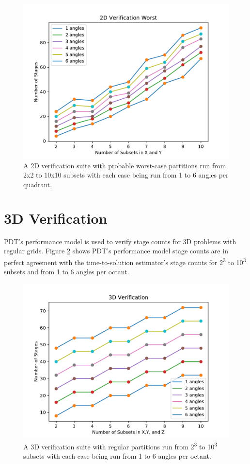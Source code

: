 \begin{figure}[H]
\centering
\includegraphics[scale=0.8]{../figures/worst_verification.pdf}
\caption{A 2D verification suite with probable worst-case partitions run from 2x2 to 10x10 subsets with each case being run from 1 to 6 angles per quadrant.}
\label{worst_verification}
\end{figure}

\section{3D Verification}
PDT's performance model is used to verify stage counts for 3D problems with regular grids.
Figure \ref{3d_verification} shows PDT's performance model stage counts are in perfect agreement with the time-to-solution estimator's stage counts for 2\textsuperscript{3} to 10\textsuperscript{3} subsets and from 1 to 6 angles per octant.

\begin{figure}[H]
\centering
\includegraphics[scale=0.8]{../figures/3d_verification.pdf}
\caption{A 3D verification suite with regular partitions run from 2\textsuperscript{3} to 10\textsuperscript{3} subsets with each case being run from 1 to 6 angles per octant.}
\label{3d_verification}
\end{figure}


